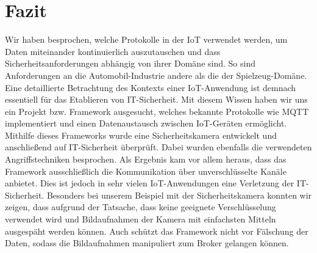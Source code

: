 \section{Fazit}
Wir haben besprochen, welche Protokolle in der IoT verwendet werden, um Daten
miteinander kontinuierlich auszutauschen und dass Sicherheitsanforderungen
abhängig von ihrer Domäne sind. So sind Anforderungen an die Automobil-Industrie
andere als die der Spielzeug-Domäne. Eine detaillierte Betrachtung des Kontexts
einer IoT-Anwendung ist demnach essentiell für das Etablieren von IT-Sicherheit.
Mit diesem Wissen haben wir uns ein Projekt bzw. Framework ausgesucht, welches
bekannte Protokolle wie MQTT implementiert und einen Datenaustausch zwischen
IoT-Geräten ermöglicht. Mithilfe dieses Frameworks wurde eine Sicherheitskamera
entwickelt und anschließend auf IT-Sicherheit überprüft. Dabei wurden ebenfalls
die verwendeten Angriffstechniken besprochen. Als Ergebnis kam vor allem heraus,
dass das Framework ausschließlich die Kommunikation über unverschlüsselte Kanäle
anbietet. Dies ist jedoch in sehr vielen IoT-Anwendungen eine Verletzung der
IT-Sicherheit. Besonders bei unserem Beispiel mit der Sicherheitskamera konnten
wir zeigen, dass aufgrund der Tatsache, dass keine geeignete Verschlüsselung
verwendet wird und Bildaufnahmen der Kamera mit einfachsten Mitteln ausgespäht
werden können. Auch schützt das Framework nicht vor Fälschung der Daten, sodass
die Bildaufnahmen manipuliert zum Broker gelangen können.
